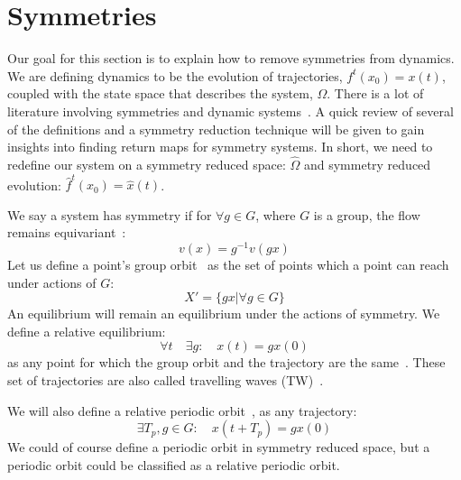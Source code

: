 \documentclass[10pt,letter]{article}
\begin{document}
\section{Symmetries}
\label{sec:Symm}
Our goal for this section is to explain how to remove symmetries from
dynamics.  We are defining dynamics to be the evolution of trajectories,
$f^{t}(x_0) = x(t)$, coupled with the state space that describes the
system, $\Omega$.  There is a lot of literature involving symmetries and
dynamic systems~\cite{CB, Eth, SliceCond, SRetMap, Atl}.  A quick review
of several of the definitions and a symmetry reduction technique will be
given to gain insights into finding return maps for symmetry systems.  In
short, we need to redefine our system on a symmetry reduced space:
$\hat{\Omega}$ and symmetry reduced evolution: $\hat{f}^{t}(x_0) =
\hat{x}(t)$.

We say a system has symmetry if for $\forall g\in G$, where $G$ is a
group, the flow remains equivariant~\cite{CB}:
\begin{equation}
v(x) = g^{-1}v(gx)
\label{eq:SymmEqui}
\end{equation}
Let us define a point's group orbit~\cite{CB} as the set of points which
a point can reach under actions of $G$:
\begin{equation}
X' = \{gx | \forall g \in G\}
\end{equation}
An equilibrium will remain an equilibrium under the actions of symmetry.
We define a relative equilibrium:
\begin{equation}
\forall t \quad \exists{g}: \quad x(t) = gx(0)
\end{equation}
as any point for which the group orbit and the trajectory are the
same~\cite{CB}.  These set of trajectories are also called travelling
waves (TW)~\cite{CB}.

We will also define a relative periodic orbit~\cite{CB}, as any trajectory:
\begin{equation}
\exists{T_p}, g\in G: \quad  x(t+T_p) = gx(0)
\end{equation}
We could of course define a periodic orbit in symmetry reduced space, but
a periodic orbit could be classified as a relative periodic orbit.
\end{document}
